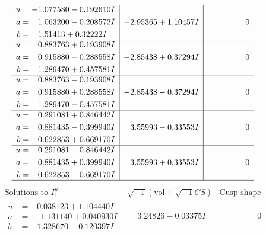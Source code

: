\documentclass[1p]{elsarticle_modified}
\theoremstyle{definition}
\newcommand{\I}{\sqrt{-1}}
\begin{document}
$$\begin{array}{c|c|c}
\begin{aligned}
u &= -1.077580 - 0.192610 I \\
a &= \phantom{-}1.063200 - 0.208572 I \\
b &= \phantom{-}1.51413 + 0.32222 I\end{aligned}
 & -2.95365 + 1.10457 I & \phantom{-0.000000 } 0 \\ \hline\begin{aligned}
u &= \phantom{-}0.883763 + 0.193908 I \\
a &= \phantom{-}0.915880 - 0.288558 I \\
b &= \phantom{-}1.289470 + 0.457581 I\end{aligned}
 & -2.85438 + 0.37294 I & \phantom{-0.000000 } 0 \\ \hline\begin{aligned}
u &= \phantom{-}0.883763 - 0.193908 I \\
a &= \phantom{-}0.915880 + 0.288558 I \\
b &= \phantom{-}1.289470 - 0.457581 I\end{aligned}
 & -2.85438 - 0.37294 I & \phantom{-0.000000 } 0 \\ \hline\begin{aligned}
u &= \phantom{-}0.291081 + 0.846442 I \\
a &= \phantom{-}0.881435 - 0.399940 I \\
b &= -0.622853 + 0.669170 I\end{aligned}
 & \phantom{-}3.55993 - 0.33553 I & \phantom{-0.000000 } 0 \\ \hline\begin{aligned}
u &= \phantom{-}0.291081 - 0.846442 I \\
a &= \phantom{-}0.881435 + 0.399940 I \\
b &= -0.622853 - 0.669170 I\end{aligned}
 & \phantom{-}3.55993 + 0.33553 I & \phantom{-0.000000 } 0\\
 \hline 
 \end{array}$$\newpage$$\begin{array}{c|c|c}  
\text{Solutions to }I^u_{1}& \I (\text{vol} + \sqrt{-1}CS) & \text{Cusp shape}\\
 \hline 
\begin{aligned}
u &= -0.038123 + 1.104440 I \\
a &= \phantom{-}1.131140 + 0.040930 I \\
b &= -1.328670 - 0.120397 I\end{aligned}
 & \phantom{-}3.24826 - 0.03375 I & \phantom{-0.000000 } 0 \\ \hline\begin{aligned}

\end{aligned}
\end{array}$$
\end{document}
